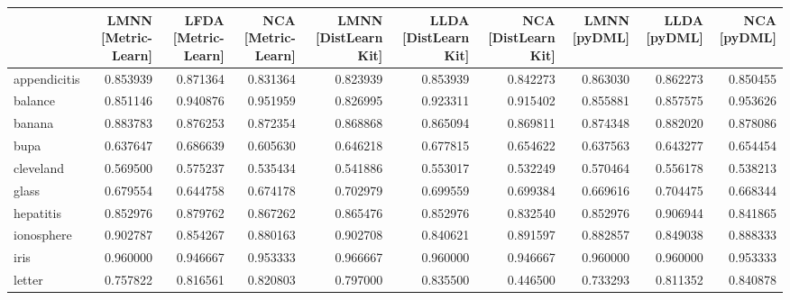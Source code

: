 \begin{tabular}{lrrrrrrrrr}
\toprule
{} &  LMNN [Metric-Learn] &  LFDA [Metric-Learn] &  NCA [Metric-Learn] &  LMNN [DistLearn Kit] &  LLDA [DistLearn Kit] &  NCA [DistLearn Kit] &  LMNN [pyDML] &  LLDA [pyDML] &  NCA [pyDML] \\
\midrule
appendicitis    &             0.853939 &             0.871364 &            0.831364 &              0.823939 &              0.853939 &             0.842273 &      0.863030 &      0.862273 &     0.850455 \\
balance         &             0.851146 &             0.940876 &            0.951959 &              0.826995 &              0.923311 &             0.915402 &      0.855881 &      0.857575 &     0.953626 \\
banana          &             0.883783 &             0.876253 &            0.872354 &              0.868868 &              0.865094 &             0.869811 &      0.874348 &      0.882020 &     0.878086 \\
bupa            &             0.637647 &             0.686639 &            0.605630 &              0.646218 &              0.677815 &             0.654622 &      0.637563 &      0.643277 &     0.654454 \\
cleveland       &             0.569500 &             0.575237 &            0.535434 &              0.541886 &              0.553017 &             0.532249 &      0.570464 &      0.556178 &     0.538213 \\
glass           &             0.679554 &             0.644758 &            0.674178 &              0.702979 &              0.699559 &             0.699384 &      0.669616 &      0.704475 &     0.668344 \\
hepatitis       &             0.852976 &             0.879762 &            0.867262 &              0.865476 &              0.852976 &             0.832540 &      0.852976 &      0.906944 &     0.841865 \\
ionosphere      &             0.902787 &             0.854267 &            0.880163 &              0.902708 &              0.840621 &             0.891597 &      0.882857 &      0.849038 &     0.888333 \\
iris            &             0.960000 &             0.946667 &            0.953333 &              0.966667 &              0.960000 &             0.946667 &      0.960000 &      0.960000 &     0.953333 \\
letter          &             0.757822 &             0.816561 &            0.820803 &              0.797000 &              0.835500 &             0.446500 &      0.733293 &      0.811352 &     0.840878 \\

\end{tabular}
